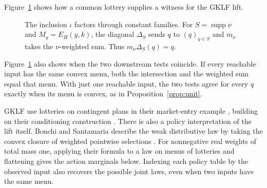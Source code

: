 \documentclass[11pt,a4paper]{article}
\theoremstyle{definition}
\newcommand{\conv}{\operatorname{conv}}
\newcommand{\supp}{\operatorname{supp}}
\begin{document}
Figure~\ref{fig:two-tests} shows how a common lottery supplies a witness for the GKLF lift.

\begin{figure}[!htbp]
    \centering
    \caption{The inclusion $\iota$ factors through constant families. For $S=\supp\nu$ and $M_y=E_H(y,k)$, the diagonal $\Delta_S$ sends $q$ to $(q)_{y\in S}$ and $m_\nu$ takes the $\nu$-weighted sum. Thus $m_\nu\Delta_S(q)=q$.}\label{fig:two-tests}
\end{figure}

Figure~\ref{fig:two-tests} also shows when the two downstream tests coincide. If every reachable input has the same convex menu, both the intersection and the weighted sum equal that menu. With just one reachable input, the two tests agree for every $q$ exactly when its menu is convex, as in Proposition~\ref{prop:unit}.

GKLF use lotteries on contingent plans in their market-entry example \cite[Example~13]{gklf}, building on their conditioning construction \cite[Section~3]{iterated}. There is also a policy interpretation of the lift itself. Bonchi and Santamaria describe the weak distributive law by taking the convex closure of weighted pointwise selections \cite[Theorem~3.5]{bonchi}. For nonnegative real weights of total mass one, applying their formula to a law on menus of lotteries and flattening gives the action marginals below. Indexing each policy table by the observed input also recovers the possible joint laws, even when two inputs have the same menu.
\end{document}
